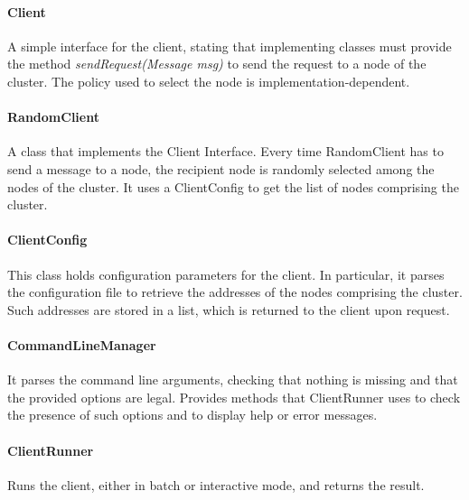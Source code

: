\documentclass{article}
\begin{document}
\paragraph{Client} A simple interface for the client, stating that implementing classes must provide the method \textit{sendRequest(Message msg)} to send the request to a node of the cluster. The policy used to select the node is implementation-dependent.
\paragraph{RandomClient} A class that implements the Client Interface. Every time RandomClient has to send a message to a node, the recipient node is randomly selected among the nodes of the cluster. It uses a ClientConfig to get the list of nodes comprising the cluster.
\paragraph{ClientConfig} This class holds configuration parameters for the client. In particular, it parses the configuration file to retrieve the addresses of the nodes comprising the cluster. Such addresses are stored in a list, which is returned to the client upon request.
\paragraph{CommandLineManager} It parses the command line arguments, checking that nothing is missing and that the provided options are legal. Provides methods that ClientRunner uses to check the presence of such options and to display help or error messages.
\paragraph{ClientRunner} Runs the client, either in batch or interactive mode, and returns the result. 
\end{document}
